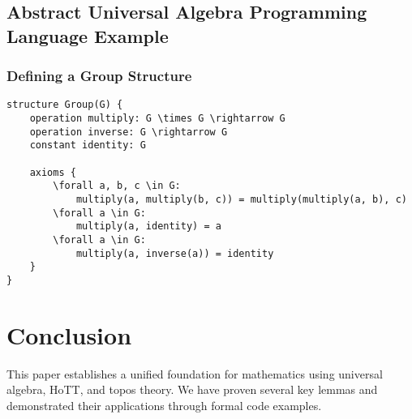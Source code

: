 \documentclass{article}
\begin{document}
\subsection{Abstract Universal Algebra Programming Language Example}


\subsubsection{Defining a Group Structure}

\begin{lstlisting}
structure Group(G) {
    operation multiply: G \times G \rightarrow G
    operation inverse: G \rightarrow G
    constant identity: G

    axioms {
        \forall a, b, c \in G:
            multiply(a, multiply(b, c)) = multiply(multiply(a, b), c)
        \forall a \in G:
            multiply(a, identity) = a
        \forall a \in G:
            multiply(a, inverse(a)) = identity
    }
}
\end{lstlisting}

\section{Conclusion}

This paper establishes a unified foundation for mathematics using universal algebra, HoTT, and topos theory. We have proven several key lemmas and demonstrated their applications through formal code examples.
\end{document}
